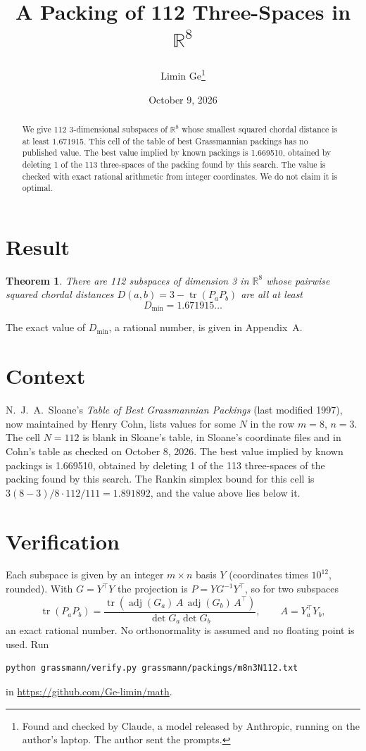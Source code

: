 \documentclass[11pt,a4paper]{article}
\title{A Packing of 112 Three-Spaces in $\mathbb{R}^{8}$}
\author{Limin Ge\thanks{Found and checked by Claude, a model released by Anthropic, running on the author's laptop. The author sent the prompts.}}
\date{October 9, 2026}
\newtheorem*{theorem}{Theorem}
\begin{document}
\maketitle
\begin{abstract}
We give 112 3-dimensional subspaces of $\mathbb{R}^{8}$ whose smallest squared chordal distance is at least 1.671915. This cell of the table of best Grassmannian packings has no published value. The best value implied by known packings is 1.669510, obtained by deleting 1 of the 113 three-spaces of the packing found by this search. The value is checked with exact rational arithmetic from integer coordinates. We do not claim it is optimal.
\end{abstract}

\section{Result}
\begin{theorem}
There are 112 subspaces of dimension 3 in $\mathbb{R}^{8}$ whose pairwise squared chordal distances $D(a,b) = 3 - \operatorname{tr}(P_aP_b)$ are all at least
\[ D_{\min} = 1.671915\ldots \]
\end{theorem}
The exact value of $D_{\min}$, a rational number, is given in Appendix~A.


\section{Context}
N.~J.~A.~Sloane's \emph{Table of Best Grassmannian Packings} (last modified 1997), now maintained by Henry Cohn, lists values for some $N$ in the row $m=8$, $n=3$. The cell $N=112$ is blank in Sloane's table, in Sloane's coordinate files and in Cohn's table as checked on October 8, 2026. The best value implied by known packings is 1.669510, obtained by deleting 1 of the 113 three-spaces of the packing found by this search. The Rankin simplex bound for this cell is $3(8-3)/8\cdot 112/111 = 1.891892$, and the value above lies below it.


\section{Verification}
Each subspace is given by an integer $m\times n$ basis $Y$ (coordinates times $10^{12}$, rounded). With $G=Y^\top Y$ the projection is $P=YG^{-1}Y^\top$, so for two subspaces
\[ \operatorname{tr}(P_aP_b)=\frac{\operatorname{tr}(\operatorname{adj}(G_a)\,A\,\operatorname{adj}(G_b)\,A^\top)}{\det G_a\det G_b},\qquad A=Y_a^\top Y_b, \]
an exact rational number. No orthonormality is assumed and no floating point is used. Run
\begin{verbatim}
python grassmann/verify.py grassmann/packings/m8n3N112.txt
\end{verbatim}
in \url{https://github.com/Ge-limin/math}.
\end{document}
